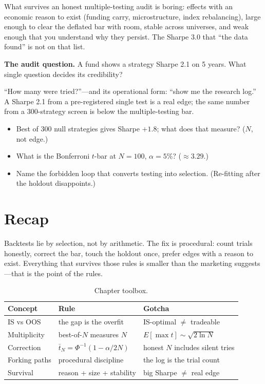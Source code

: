 What survives an honest multiple-testing audit is boring: effects with an economic reason
to exist (funding carry, microstructure, index rebalancing), large enough to clear the
deflated bar with room, stable across universes, and weak enough that you understand why
they persist. The Sharpe 3.0 that ``the data found'' is not on that list.

\begin{example}\label{ex:audit}
\textbf{The audit question.} A fund shows a strategy Sharpe 2.1 on 5 years. What single
question decides its credibility?
\begin{solution}
``How many were tried?''---and its operational form: ``show me the research log.'' A
Sharpe 2.1 from a pre-registered single test is a real edge; the same number from a
300-strategy screen is below the multiple-testing bar.
\end{solution}
\end{example}

\begin{checkpoint}
\begin{itemize}
\item Best of 300 null strategies gives Sharpe $+1.8$; what does that measure? ($N$, not
edge.)
\item What is the Bonferroni $t$-bar at $N{=}100$, $\alpha=5\%$? ($\approx3.29$.)
\item Name the forbidden loop that converts testing into selection. (Re-fitting after the
holdout disappoints.)
\end{itemize}
\end{checkpoint}

\section{Recap}\label{sec:liesrecap}

Backtests lie by selection, not by arithmetic. The fix is procedural: count trials
honestly, correct the bar, touch the holdout once, prefer edges with a reason to exist.
Everything that survives those rules is smaller than the marketing suggests---that is
the point of the rules.

\begin{table}[htbp]\centering\small
\caption{Chapter toolbox.}
\begin{tabular}{@{}lll@{}}
\toprule
Concept & Rule & Gotcha\\
\midrule
IS vs OOS & the gap is the overfit & IS-optimal $\neq$ tradeable\\
Multiplicity & best-of-$N$ measures $N$ & $E[\max t]\sim\sqrt{2\ln N}$\\
Correction & $\bar t_N=\Phi^{-1}(1-\alpha/2N)$ & honest $N$ includes silent tries\\
Forking paths & procedural discipline & the log is the trial count\\
Survival & reason + size + stability & big Sharpe $\neq$ real edge\\
\bottomrule
\end{tabular}
\end{table}

